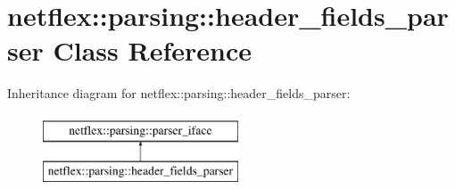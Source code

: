 \hypertarget{classnetflex_1_1parsing_1_1header__fields__parser}{}\section{netflex\+:\+:parsing\+:\+:header\+\_\+fields\+\_\+parser Class Reference}
\label{classnetflex_1_1parsing_1_1header__fields__parser}
Inheritance diagram for netflex\+:\+:parsing\+:\+:header\+\_\+fields\+\_\+parser\+:\begin{figure}[H]
\begin{center}
\leavevmode
\includegraphics[height=2.000000cm]{classnetflex_1_1parsing_1_1header__fields__parser}
\end{center}
\end{figure}

